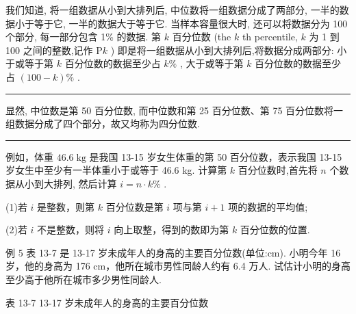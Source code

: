 \documentclass[10pt]{article}
\newcommand{\HRule}{\begin{center}\rule{0.9\linewidth}{0.2mm}\end{center}}
\begin{document}
我们知道, 将一组数据从小到大排列后, 中位数将一组数据分成了两部分, 一半的数据小于等于它, 一半的数据大于等于它. 当样本容量很大时, 还可以将数据分为 100 个部分, 每一部分包含 1\% 的数据. 第 \(k\) 百分位数 (the \(k\) th percentile, \(k\) 为 1 到 100 之间的整数,记作 \(\mathrm{P}k\) ) 即是将一组数据从小到大排列后,将数据分成两部分: 小于或等于第 \(k\) 百分位数的数据至少占 \(k\%\) , 大于或等于第 \(k\) 百分位数的数据至少占 \(\left( {{100} - k}\right) \%\) .

\HRule

显然, 中位数是第 50 百分位数, 而中位数和第 25 百分位数、第 75 百分位数将一组数据分成了四个部分，故又均称为四分位数.

\HRule





例如，体重 \({46.6}\mathrm{\;{kg}}\) 是我国 13-15 岁女生体重的第 50 百分位数，表示我国 13-15 岁女生中至少有一半体重小于或等于 46.6 kg. 计算第 \(k\) 百分位数时,首先将 \(n\) 个数据从小到大排列, 然后计算 \(i = n \cdot  k\%\) .

(1)若 \(i\) 是整数，则第 \(k\) 百分位数是第 \(i\) 项与第 \(i + 1\) 项的数据的平均值;

(2)若 \(i\) 不是整数，则将 \(i\) 向上取整，得到的数即为第 \(k\) 百分位数的位置.

例 5 表 13-7 是 13-17 岁未成年人的身高的主要百分位数(单位:cm). 小明今年 16 岁，他的身高为 176 cm，他所在城市男性同龄人约有 6.4 万人. 试估计小明的身高至少高于他所在城市多少男性同龄人.

表 13-7 13-17 岁未成年人的身高的主要百分位数

\begin{center}
\end{center}
\end{document}
